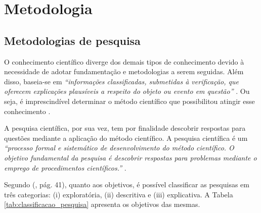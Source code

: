 \chapter[Metodologia]{Metodologia}




\section{Metodologias de pesquisa}

O conhecimento científico diverge dos demais tipos de conhecimento devido à necessidade de adotar fundamentação e metodologias a serem seguidas. Além disso, baseia-se em \textit{“informações classificadas, submetidas à verificação, que oferecem explicações plausíveis a respeito do objeto ou evento em questão”} \cite[pág. 22]{prodanov2013}. Ou seja, é imprescindível determinar o método científico que possibilitou atingir esse conhecimento \cite[pág. 24]{prodanov2013}. 

A pesquisa científica, por sua vez, tem por finalidade descobrir respostas para questões mediante a aplicação do método científico. A pesquisa científica é um \textit{“processo formal e sistemático de desenvolvimento do método científico. O objetivo fundamental da pesquisa é descobrir respostas para problemas mediante o emprego de procedimentos científicos.”}  \cite[pág. 26]{gil2008}.

Segundo \citeauthor{gil2002} (\citeyear{gil2002}, pág. 41), quanto aos objetivos, é possível classificar as pesquisas em
três categorias: (i) exploratória, (ii) descritiva e (iii) explicativa. A Tabela \ref{tab:classificacao_pesquisa} apresenta os objetivos das mesmas.

